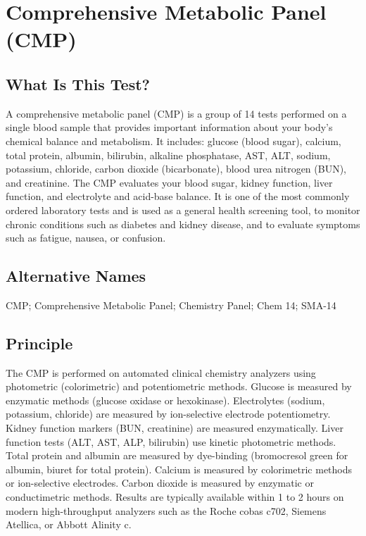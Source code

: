 \chapter{Comprehensive Metabolic Panel (CMP)}

\section*{What Is This Test?}
A comprehensive metabolic panel (CMP) is a group of 14 tests performed on a single blood sample that provides important information about your body's chemical balance and metabolism. It includes: glucose (blood sugar), calcium, total protein, albumin, bilirubin, alkaline phosphatase, AST, ALT, sodium, potassium, chloride, carbon dioxide (bicarbonate), blood urea nitrogen (BUN), and creatinine. The CMP evaluates your blood sugar, kidney function, liver function, and electrolyte and acid-base balance. It is one of the most commonly ordered laboratory tests and is used as a general health screening tool, to monitor chronic conditions such as diabetes and kidney disease, and to evaluate symptoms such as fatigue, nausea, or confusion.

\section*{Alternative Names}
CMP; Comprehensive Metabolic Panel; Chemistry Panel; Chem 14; SMA-14

\section*{Principle}
The CMP is performed on automated clinical chemistry analyzers using photometric (colorimetric) and potentiometric methods. Glucose is measured by enzymatic methods (glucose oxidase or hexokinase). Electrolytes (sodium, potassium, chloride) are measured by ion-selective electrode potentiometry. Kidney function markers (BUN, creatinine) are measured enzymatically. Liver function tests (ALT, AST, ALP, bilirubin) use kinetic photometric methods. Total protein and albumin are measured by dye-binding (bromocresol green for albumin, biuret for total protein). Calcium is measured by colorimetric methods or ion-selective electrodes. Carbon dioxide is measured by enzymatic or conductimetric methods. Results are typically available within 1 to 2 hours on modern high-throughput analyzers such as the Roche cobas c702, Siemens Atellica, or Abbott Alinity c.

